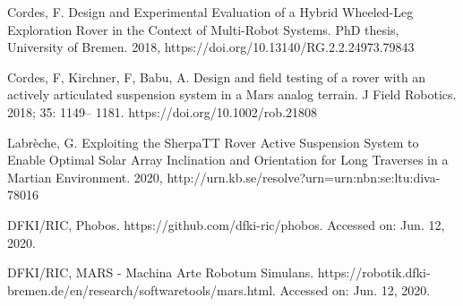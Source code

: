 \documentclass[twocolumn,letterpaper]{IEEEAerospaceCLS}  %
\begin{document}

%
\begin{thebibliography}{1}

Cordes, F. Design and Experimental Evaluation of a Hybrid Wheeled-Leg Exploration Rover in the Context of Multi-Robot Systems. PhD thesis, University of Bremen. 2018, https://doi.org/10.13140/RG.2.2.24973.79843

Cordes, F, Kirchner, F, Babu, A. Design and field testing of a rover with an actively articulated suspension system in a Mars analog terrain. J Field Robotics. 2018; 35: 1149– 1181. https://doi.org/10.1002/rob.21808

Labrèche, G. Exploiting the SherpaTT Rover Active Suspension System to Enable Optimal Solar Array Inclination and Orientation for Long Traverses in a Martian Environment. 2020, http://urn.kb.se/resolve?urn=urn:nbn:se:ltu:diva-78016

DFKI/RIC, Phobos. https://github.com/dfki-ric/phobos. Accessed on: Jun. 12, 2020.

DFKI/RIC, MARS - Machina Arte Robotum Simulans. https://robotik.dfki-bremen.de/en/research/softwaretools/mars.html. Accessed on: Jun. 12, 2020.

\end{thebibliography}
\end{document}
